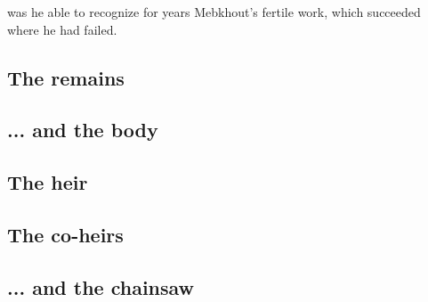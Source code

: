 was he able to recognize for years Mebkhout's fertile work, which succeeded where he had failed. 












\subsection{The remains}


\subsection{... and the body}


\subsection{The heir}


\subsection{The co-heirs}






\subsection{... and the chainsaw}








%